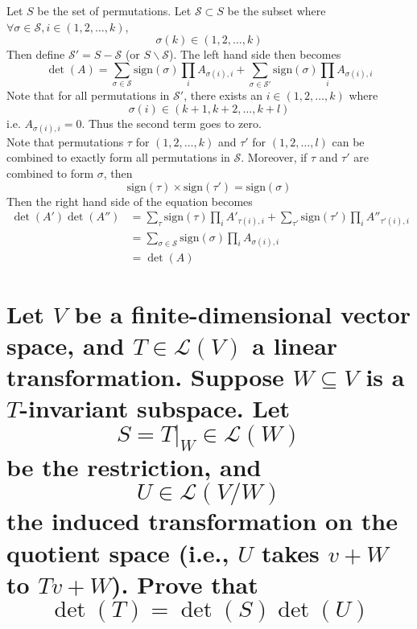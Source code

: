\documentclass[answers]{exam}
\begin{document}
\begin{questions}
\begin{parts}
\begin{solution}
	Let $S$ be the set of permutations. Let $\mathcal{S} \subset S$ be the subset where $\forall\sigma\in\mathcal{S},i\in(1,2,\dots,k)$,
	$$\sigma(k) \in (1,2,\dots,k)$$
	Then define $\mathcal{S}' = S-\mathcal{S}$ (or $S\backslash\mathcal{S}$). The left hand side then becomes
	$$\det(A) = \sum_{\sigma\in\mathcal{S}} \text{sign}(\sigma)\prod_iA_{\sigma(i),i} + \sum_{\sigma\in\mathcal{S}'} \text{sign}(\sigma)\prod_iA_{\sigma(i),i}$$
	Note that for all permutations in $\mathcal{S}'$, there exists an $i \in (1,2,\dots,k)$ where
	$$\sigma(i) \in (k+1,k+2,\dots,k+l)$$
	i.e. $A_{\sigma(i),i} = 0$. Thus the second term goes to zero. \\
	Note that permutations $\tau$ for $(1,2,\dots,k)$ and $\tau'$ for $(1,2,\dots,l)$ can be combined to exactly form all permutations in $\mathcal{S}$. Moreover, if $\tau$ and $\tau'$ are combined to form $\sigma$, then
	$$\text{sign}(\tau)\times\text{sign}(\tau') = \text{sign}(\sigma)$$
	Then the right hand side of the equation becomes
	\begin{align*}
		\det(A')\det(A'') &= \sum_\tau \text{sign}(\tau)\prod_i A'_{\tau(i),i} + \sum_{\tau'} \text{sign}(\tau')\prod_i A''_{\tau'(i),i} \\
				  &= \sum_{\sigma\in\mathcal{S}} \text{sign}(\sigma) \prod_i A_{\sigma(i),i} \\
				  &= \det(A)
	\end{align*}
\end{solution}

\part{Let $V$ be a finite-dimensional vector space, and $T\in\mathcal{L}(V)$ a linear transformation. Suppose $W\subseteq V$ is a $T$-invariant subspace. Let
	$$S = T|_W\in\mathcal{L}(W)$$
	be the restriction, and
	$$U \in \mathcal{L}(V/W)$$
	the induced transformation on the quotient space (i.e., $U$ takes $v+W$ to $Tv+W$). Prove that
	$$\det(T) = \det(S)\det(U)$$
}


\end{parts}
\end{questions}
\end{document}
